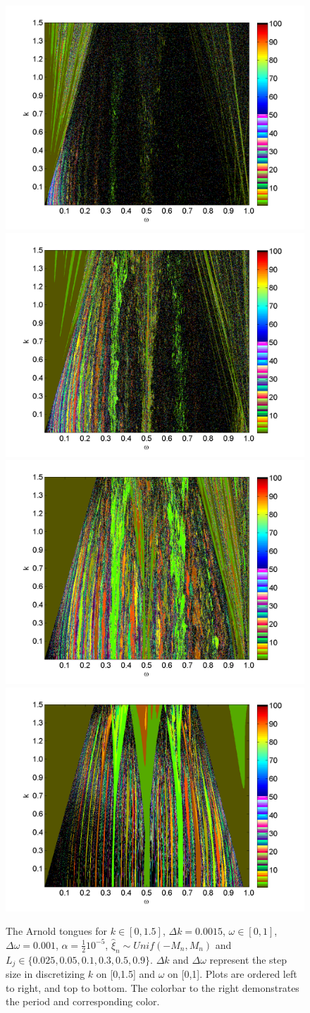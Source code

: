 \begin{figure}[H]\linespread{1}  
\caption[The Arnold tongues for the random circle map, uniform
distribution, $\alpha = \frac{1}{2}10^{-5}$]{The Arnold
  tongues for $k\in [0,1.5]$, $\Delta k = 0.0015$, $\omega \in [0,1]$,
  $\Delta \omega = 0.001$, $\alpha = \frac{1}{2}10^{-5}$, $\hat{\xi}_n\sim Unif(-M_n,M_n)$ and $L_j \in
  \{0.025,0.05,0.1,0.3,0.5,0.9\}$. $\Delta k$ and $\Delta \omega$
  represent the step size in discretizing $k$ on [0,1.5] and $\omega$
  on [0,1]. Plots are ordered left to right,
  and top to bottom. The colorbar to the right demonstrates the period and corresponding color.}\label{fig:rcirctongues_u_ha}
\centering
\includegraphics[width=.5\textwidth]{figs/tongues_u_halfa_1000_L_0025.png}\hfill
\includegraphics[width=.5\textwidth]{figs/tongues_u_halfa_1000_L_005.png}\\
\includegraphics[width=.5\textwidth]{figs/tongues_u_halfa_1000_L_01.png}\hfill
\includegraphics[width=.5\textwidth]{figs/tongues_u_halfa_1000_L_03.png}\\

\end{figure}
